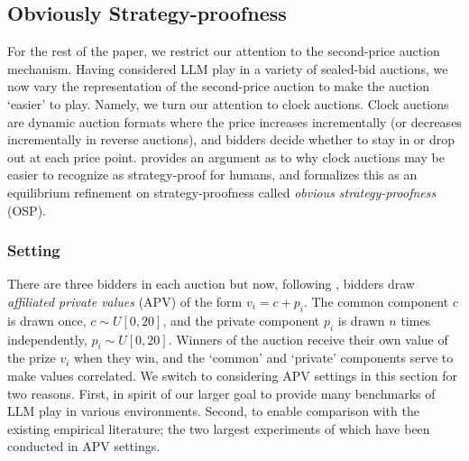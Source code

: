 \documentclass{article} %
\begin{document}
\subsection{Obviously Strategy-proofness}\label{session:OSP}
For the rest of the paper, we restrict our attention to the second-price auction mechanism. Having considered LLM play in a variety of sealed-bid auctions, we now vary the representation of the second-price auction to make the auction `easier' to play. Namely, we turn our attention to clock auctions. Clock auctions are dynamic auction formats where the price increases incrementally (or decreases incrementally in reverse auctions), and bidders decide whether to stay in or drop out at each price point.
\citet{li2017obviously} provides an argument as to why clock auctions may be easier to recognize as strategy-proof for humans, and formalizes this as an equilibrium refinement on strategy-proofness called {\em obvious strategy-proofness} (OSP).


\subsubsection{Setting}
There are three bidders in each auction but now, following \citet{li2017obviously}, bidders draw {\em affiliated private values} (APV) of the form $v_i = c + p_i$. The common component $c$ is drawn once, $c \sim U[0, 20]$, and the private component $p_i$ is drawn $n$ times independently, $p_i \sim U[0, 20]$. Winners of the auction receive their own value of the prize $v_i$ when they win, and the `common' and `private' components  serve to make values correlated. We switch to considering APV settings in this section for two reasons. First, in spirit of our larger goal to provide many benchmarks of LLM play in various environments. Second, to enable comparison with the existing empirical literature; the two largest experiments of which have been conducted in APV settings. 
\end{document}
